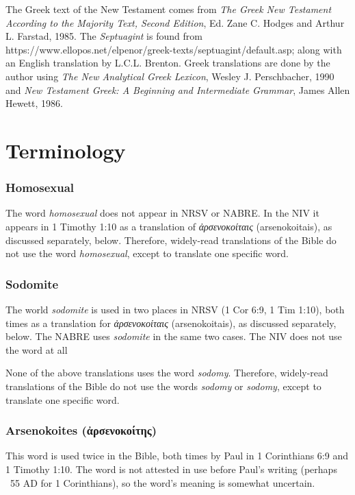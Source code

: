 \documentclass[10pt]{article}
\begin{document}
The Greek text of the New Testament comes from \textit{The Greek New Testament According to the Majority Text, Second Edition}, Ed. Zane C. Hodges and Arthur L. Farstad, 1985. The \textit{Septuagint} is found from https://www.ellopos.net/elpenor/greek-texts/septuagint/default.asp; along with an English translation by L.C.L. Brenton. Greek translations are done by the author using \textit{The New Analytical Greek Lexicon}, Wesley J. Perschbacher, 1990 and \textit{New Testament Greek: A Beginning and Intermediate Grammar}, James Allen Hewett, 1986.


\section*{Terminology}

\subsubsection*{Homosexual}

The word \textit{homosexual} does not appear in NRSV or NABRE. In the NIV it appears in 1 Timothy 1:10 as a translation of \textit{ἀρσενοκοίταις} (arsenokoitais), as discussed separately, below. Therefore, widely-read translations of the Bible do not use the word \textit{homosexual}, except to translate one specific word.

\subsubsection*{Sodomite}

\indent The world \textit{sodomite} is used in two places in NRSV (1 Cor 6:9, 1 Tim 1:10), both times as a translation for \textit{ἀρσενοκοίταις} (arsenokoitais), as discussed separately, below. The NABRE uses \textit{sodomite} in the same two cases. The NIV does not use the word at all

None of the above translations uses the word \textit{sodomy}. Therefore, widely-read translations of the Bible do not use the words \textit{sodomy} or \textit{sodomy}, except to translate one specific word.

\subsubsection*{Arsenokoites (ἀρσενοκοίτης)}

This word is used twice in the Bible, both times by Paul in 1 Corinthians 6:9 and 1 Timothy 1:10. The word is not attested in use before Paul's writing (perhaps ~55 AD for 1 Corinthians), so the word's meaning is somewhat uncertain. 
\end{document}
